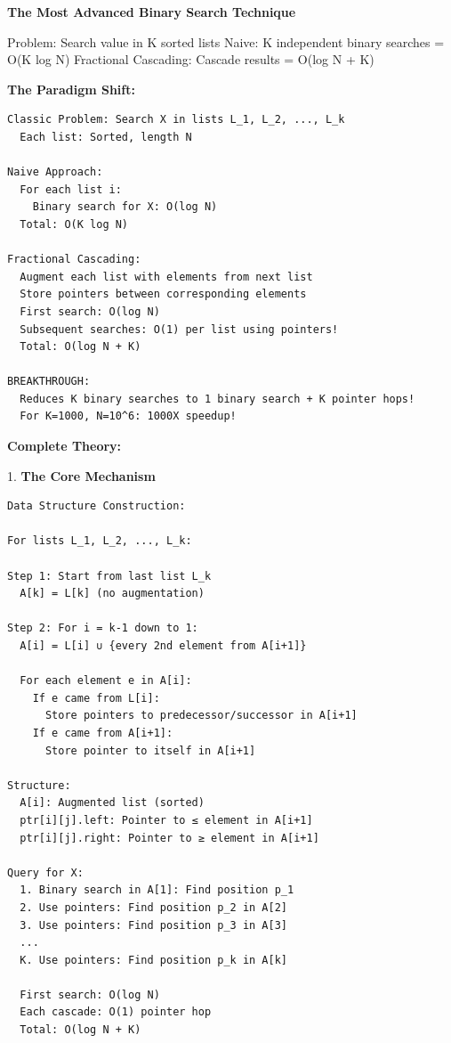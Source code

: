 \documentclass[11pt,a4paper,oneside]{book}
\begin{document}
\begin{tcolorbox}[
    enhanced,breakable,
    colback=white,
    colframe=deepblue,
    boxrule=1.5pt,
    arc=3mm,
    title=\textbf{The Ultimate Search Optimization}
]
\textbf{The Most Advanced Binary Search Technique}

Problem: Search value in K sorted lists
Naive: K independent binary searches = O(K log N)
Fractional Cascading: Cascade results = O(log N + K)

\textbf{The Paradigm Shift:}
\begin{verbatim}
Classic Problem: Search X in lists L_1, L_2, ..., L_k
  Each list: Sorted, length N

Naive Approach:
  For each list i:
    Binary search for X: O(log N)
  Total: O(K log N)

Fractional Cascading:
  Augment each list with elements from next list
  Store pointers between corresponding elements
  First search: O(log N)
  Subsequent searches: O(1) per list using pointers!
  Total: O(log N + K)

BREAKTHROUGH:
  Reduces K binary searches to 1 binary search + K pointer hops!
  For K=1000, N=10^6: 1000X speedup!
\end{verbatim}

\textbf{Complete Theory:}

1. \textbf{The Core Mechanism}
\begin{verbatim}
Data Structure Construction:

For lists L_1, L_2, ..., L_k:

Step 1: Start from last list L_k
  A[k] = L[k] (no augmentation)

Step 2: For i = k-1 down to 1:
  A[i] = L[i] ∪ {every 2nd element from A[i+1]}
  
  For each element e in A[i]:
    If e came from L[i]:
      Store pointers to predecessor/successor in A[i+1]
    If e came from A[i+1]:
      Store pointer to itself in A[i+1]

Structure:
  A[i]: Augmented list (sorted)
  ptr[i][j].left: Pointer to ≤ element in A[i+1]
  ptr[i][j].right: Pointer to ≥ element in A[i+1]

Query for X:
  1. Binary search in A[1]: Find position p_1
  2. Use pointers: Find position p_2 in A[2]
  3. Use pointers: Find position p_3 in A[3]
  ...
  K. Use pointers: Find position p_k in A[k]
  
  First search: O(log N)
  Each cascade: O(1) pointer hop
  Total: O(log N + K)
\end{verbatim}


\end{tcolorbox}
\end{document}
